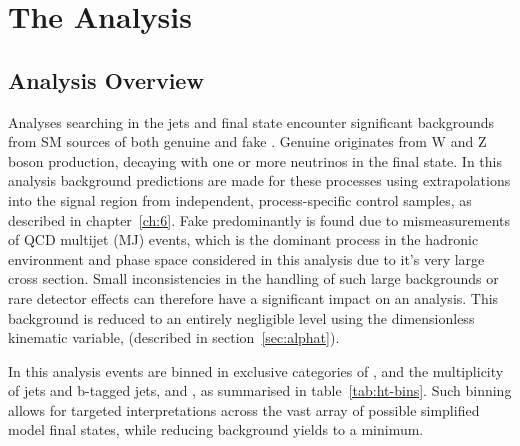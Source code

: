\chapter{The \alphat Analysis}
\label{ch:5}

\ifpdf
    \graphicspath{{Chapter5/Figs/Raster/}{Chapter5/Figs/PDF/}{Chapter5/Figs/}}
\else
    \graphicspath{{Chapter5/Figs/Vector/}{Chapter5/Figs/}}
\fi


\section{Analysis Overview}  %
\label{sec:selection_analysis_overview}

Analyses searching in the jets and \met final state encounter significant 
backgrounds from SM sources of both genuine and fake \met. Genuine \met 
originates from W and Z boson production, decaying with one or more neutrinos in
the final state. In this analysis background predictions are made for these
processes using 
extrapolations into the signal region from independent, process-specific control
samples, as described in chapter~\ref{ch:6}.
Fake \met predominantly is found due to mismeasurements of QCD 
multijet (MJ) events, which is the dominant process in the hadronic environment
and 
phase space considered in this analysis due to it's very large cross section. 
Small inconsistencies in the handling of such large backgrounds or rare detector
effects can therefore 
have a significant impact on an analysis. This background is reduced to an 
entirely negligible level using the dimensionless kinematic variable, \alphat
(described in section~\ref{sec:alphat}).


In this analysis events are binned in exclusive categories of \HT, 
and the multiplicity of jets and b-tagged jets,  
\nj and \nb, as summarised in table~\ref{tab:ht-bins}. Such binning allows for
targeted interpretations across the vast array of
possible simplified model final states, while reducing background yields to a 
minimum.

